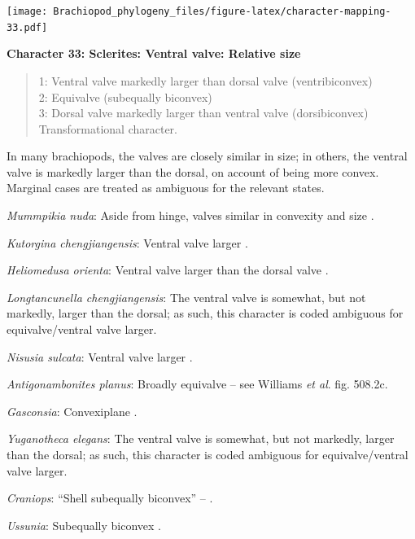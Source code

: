 \documentclass[openany]{book}
\theoremstyle{definition}
\theoremstyle{definition}
\theoremstyle{definition}
\theoremstyle{remark}
\begin{document}
\texttt{[image: Brachiopod\_phylogeny\_files/figure-latex/character-mapping-33.pdf]}

\textbf{Character 33: Sclerites: Ventral valve: Relative size}

\begin{quote}
1: Ventral valve markedly larger than dorsal valve (ventribiconvex)\\
2: Equivalve (subequally biconvex)\\
3: Dorsal valve markedly larger than ventral valve (dorsibiconvex)\\
Transformational character.
\end{quote}

In many brachiopods, the valves are closely similar in size; in others,
the ventral valve is markedly larger than the dorsal, on account of
being more convex. Marginal cases are treated as ambiguous for the
relevant states.

\emph{Mummpikia nuda}: Aside from hinge, valves similar in convexity and
size \citep{Balthasar2008iMummpikia}.

\emph{Kutorgina chengjiangensis}: Ventral valve larger \citep[see][fig.
125.]{Williams2000BrachiopodaLinguliformea}.

\emph{Heliomedusa orienta}: Ventral valve larger than the dorsal valve
\citep[p.~659]{Zhang2009Architectureand}.

\emph{Longtancunella chengjiangensis}: The ventral valve is somewhat,
but not markedly, larger than the dorsal; as such, this character is
coded ambiguous for equivalve/ventral valve larger.

\emph{Nisusia sulcata}: Ventral valve larger \citep[see][fig.
126.]{Williams2000BrachiopodaLinguliformea}.

\emph{Antigonambonites planus}: Broadly equivalve -- see Williams
\emph{et al}. \citeyearpar{Williams2000BrachiopodaLinguliformea} fig.
508.2c.

\emph{Gasconsia}: Convexiplane
\citep[p.~187]{Williams2000BrachiopodaLinguliformea}.

\emph{Yuganotheca elegans}: The ventral valve is somewhat, but not
markedly, larger than the dorsal; as such, this character is coded
ambiguous for equivalve/ventral valve larger.

\emph{Craniops}: ``Shell subequally biconvex'' --
\citet{Williams2000BrachiopodaLinguliformea}.

\emph{Ussunia}: Subequally biconvex
\citep[p.~192]{Williams2000BrachiopodaLinguliformea}.
\end{document}

